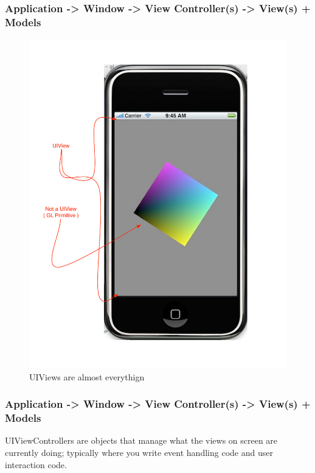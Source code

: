 \documentclass[10pt]{beamer}
\begin{document}
\begin{frame}[fragile]
  \frametitle{Application -> Window -> View Controller(s) -> View(s) + Models}
  \begin{figure}[htb]
  \begin{center}

  \includegraphics[scale=0.35]{UIViewExample2.pdf}

  \caption{UIViews are almost everythign}
  \end{center}
  \end{figure}

\end{frame}

\begin{frame}[fragile]
  \frametitle{Application -> Window -> View Controller(s) -> View(s) + Models}
  UIViewControllers are objects that manage what the views on screen are currently doing; typically where you write event handling code and user interaction code.

\end{frame}
\end{document}
